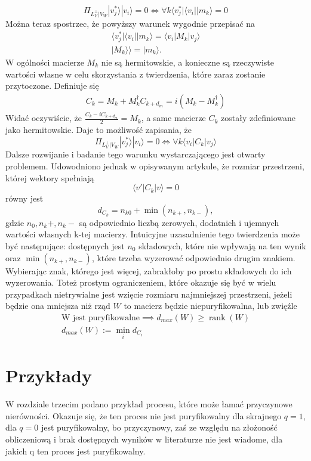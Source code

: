 \documentclass[10pt]{article} %
\DeclareMathOperator{\Rank}{rank}
\newcommand{\Ket}[1]{|#1\rangle}
\newcommand{\Bra}[1]{\langle#1|}
\newcommand{\KKet}[1]{|#1\rangle\rangle}
\newcommand{\LPV}{{L^\perp_V}}
\begin{document}
\begin{equation}
\Pi_{\LPV|V_W} \Ket{v^*_j}\Ket{v_i} = 0 \iff \forall k \Bra{v^*_j} \Bra{v_i} \Ket{m_k} = 0
\end{equation}
Można teraz spostrzec, że powyższy warunek wygodnie przepisać na
\begin{gather}
\Bra{v^*_j} \Bra{v_i} \Ket{m_k} = \Bra{v_i} M_k \Ket{v_j} \\
\KKet{M_k} = \Ket{m_k}.
\end{gather}
W ogólności macierze $M_k$ nie są hermitowskie, a konieczne są rzeczywiste wartości własne w celu skorzystania z twierdzenia, które zaraz zostanie przytoczone.
Definiuje się
\begin{gather}
C_k = M_k + M^\dag_k
C_{k+d_m} = i(M_k - M_k^\dag)
\end{gather}
Widać oczywiście, że $\frac{C_k-iC_{k+d_m}}{2} = M_k$, a same macierze $C_k$ zostały zdefiniowane jako hermitowskie. Daje to możliwość zapisania, że
\begin{equation}
\Pi_{\LPV|V_W} \Ket{v^*_j}\Ket{v_i} = 0 \iff \forall k \Bra{v_i} C_k \Ket{v_j}
\end{equation}
Dalsze rozwijanie i badanie tego warunku wystarczającego jest otwarty problemem. Udowodniono jednak w opisywanym artykule, że
rozmiar przestrzeni, której wektory spełniają
\begin{equation}
\Bra{v'}C_k\Ket{v} = 0
\end{equation} równy jest 
\begin{equation}
d_{C_k} = n_{k0} + \min({n_{k+}, n_{k-}}),
\end{equation} gdzie $n_0, n_k+, n_k-$ są odpowiednio liczbą zerowych, dodatnich i ujemnych wartości własnych k-tej macierzy. Intuicyjne uzasadnienie tego twierdzenia może być następujące: dostępnych jest $n_0$ składowych, które nie wpływają na ten wynik oraz $\min({n_{k+}, n_{k-}})$, które trzeba wyzerować odpowiednio drugim znakiem. Wybierając znak, którego jest więcej, zabrakłoby po prostu składowych do ich wyzerowania.
Toteż prostym ograniczeniem, które okazuje się być w wielu przypadkach nietrywialne jest wzięcie rozmiaru najmniejszej przestrzeni, jeżeli będzie ona mniejsza niż rząd $W$ to macierz będzie niepuryfikowalna, lub zwięźle
\begin{gather}
\text{W jest puryfikowalne} \implies d_{max}(W) \geq \Rank(W) \\
d_{max}(W) := \min_i d_{C_i} 
\end{gather}
\section{Przykłady}
W rozdziale trzecim podano przykład procesu, które może łamać przyczynowe nierówności. Okazuje się, że ten proces nie jest puryfikowalny dla skrajnego $q = 1$, dla $q=0$ jest puryfikowalny, bo przyczynowy, zaś ze względu na złożoność obliczeniową i brak dostępnych wyników w literaturze nie jest wiadome, dla jakich q ten proces jest puryfikowalny.
\end{document}
